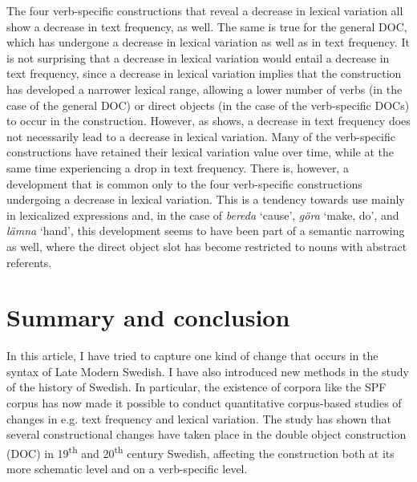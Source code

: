 \documentclass[output=paper]{langscibook}
\begin{document}
The four verb-specific constructions that reveal a decrease in lexical variation all show a decrease in text frequency, as well. The same is true for the general DOC, which has undergone a decrease in lexical variation as well as in text frequency. It is not surprising that a decrease in lexical variation would entail a decrease in text frequency, since a decrease in lexical variation implies that the construction has developed a narrower lexical range, allowing a lower number of verbs (in the case of the general DOC) or direct objects (in the case of the verb-specific DOCs) to occur in the construction. However, as  shows, a decrease in text frequency does not necessarily lead to a decrease in lexical variation. Many of the verb-specific constructions have retained their lexical variation value over time, while at the same time experiencing a drop in text frequency. There is, however, a development that is common only to the four verb-specific constructions undergoing a decrease in lexical variation. This is a tendency towards use mainly in lexicalized expressions and, in the case of \textit{bereda} ‘cause’, \textit{göra} ‘make, do’, and \textit{lämna} ‘hand’, this development seems to have been part of a semantic narrowing as well, where the direct object slot has become restricted to nouns with abstract referents.\pagebreak


\section{Summary and conclusion}\label{sec:valdeson:6}

In this article, I have tried to capture one kind of change that occurs in the syntax of Late Modern Swedish. I have also introduced new methods in the study of the history of Swedish. In particular, the existence of corpora like the SPF corpus has now made it possible to conduct quantitative corpus-based studies of changes in e.g. text frequency and lexical variation. The study has shown that several constructional changes have taken place in the double object construction (DOC) in 19\textsuperscript{th} and 20\textsuperscript{th} century Swedish, affecting the construction both at its more schematic level and on a verb-specific level. 
\end{document}
